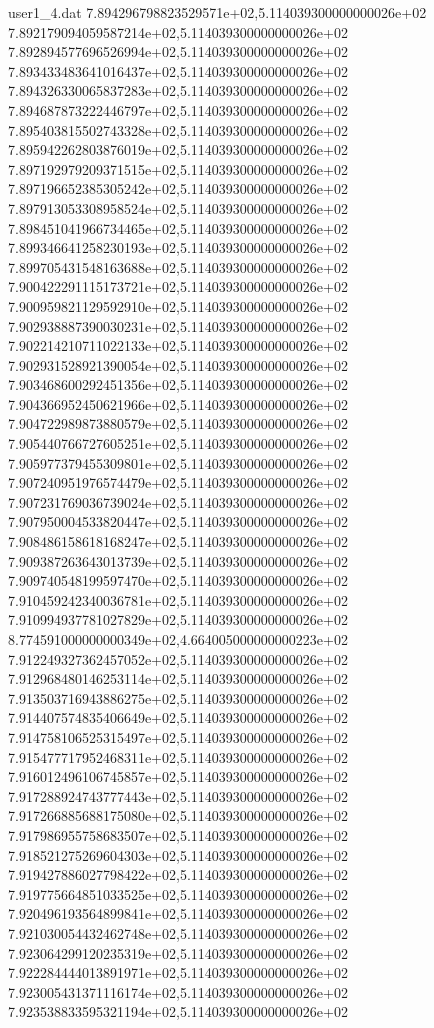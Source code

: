 \begin{filecontents}{user1_4.dat}
7.894296798823529571e+02,5.114039300000000026e+02
7.892179094059587214e+02,5.114039300000000026e+02
7.892894577696526994e+02,5.114039300000000026e+02
7.893433483641016437e+02,5.114039300000000026e+02
7.894326330065837283e+02,5.114039300000000026e+02
7.894687873222446797e+02,5.114039300000000026e+02
7.895403815502743328e+02,5.114039300000000026e+02
7.895942262803876019e+02,5.114039300000000026e+02
7.897192979209371515e+02,5.114039300000000026e+02
7.897196652385305242e+02,5.114039300000000026e+02
7.897913053308958524e+02,5.114039300000000026e+02
7.898451041966734465e+02,5.114039300000000026e+02
7.899346641258230193e+02,5.114039300000000026e+02
7.899705431548163688e+02,5.114039300000000026e+02
7.900422291115173721e+02,5.114039300000000026e+02
7.900959821129592910e+02,5.114039300000000026e+02
7.902938887390030231e+02,5.114039300000000026e+02
7.902214210711022133e+02,5.114039300000000026e+02
7.902931528921390054e+02,5.114039300000000026e+02
7.903468600292451356e+02,5.114039300000000026e+02
7.904366952450621966e+02,5.114039300000000026e+02
7.904722989873880579e+02,5.114039300000000026e+02
7.905440766727605251e+02,5.114039300000000026e+02
7.905977379455309801e+02,5.114039300000000026e+02
7.907240951976574479e+02,5.114039300000000026e+02
7.907231769036739024e+02,5.114039300000000026e+02
7.907950004533820447e+02,5.114039300000000026e+02
7.908486158618168247e+02,5.114039300000000026e+02
7.909387263643013739e+02,5.114039300000000026e+02
7.909740548199597470e+02,5.114039300000000026e+02
7.910459242340036781e+02,5.114039300000000026e+02
7.910994937781027829e+02,5.114039300000000026e+02
8.774591000000000349e+02,4.664005000000000223e+02
7.912249327362457052e+02,5.114039300000000026e+02
7.912968480146253114e+02,5.114039300000000026e+02
7.913503716943886275e+02,5.114039300000000026e+02
7.914407574835406649e+02,5.114039300000000026e+02
7.914758106525315497e+02,5.114039300000000026e+02
7.915477717952468311e+02,5.114039300000000026e+02
7.916012496106745857e+02,5.114039300000000026e+02
7.917288924743777443e+02,5.114039300000000026e+02
7.917266885688175080e+02,5.114039300000000026e+02
7.917986955758683507e+02,5.114039300000000026e+02
7.918521275269604303e+02,5.114039300000000026e+02
7.919427886027798422e+02,5.114039300000000026e+02
7.919775664851033525e+02,5.114039300000000026e+02
7.920496193564899841e+02,5.114039300000000026e+02
7.921030054432462748e+02,5.114039300000000026e+02
7.923064299120235319e+02,5.114039300000000026e+02
7.922284444013891971e+02,5.114039300000000026e+02
7.923005431371116174e+02,5.114039300000000026e+02
7.923538833595321194e+02,5.114039300000000026e+02

\end{filecontents}
